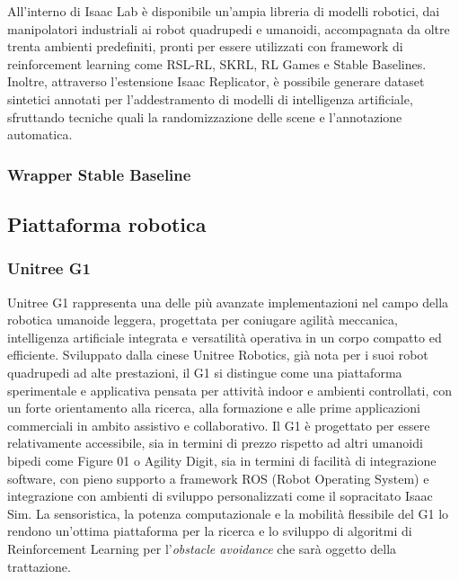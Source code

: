 All’interno di Isaac Lab è disponibile un’ampia libreria di modelli robotici, dai manipolatori industriali ai robot quadrupedi e umanoidi, accompagnata da oltre trenta ambienti predefiniti, pronti per essere utilizzati con framework di reinforcement learning come RSL-RL, SKRL, RL Games e Stable Baselines. Inoltre, attraverso l’estensione Isaac Replicator, è possibile generare dataset sintetici annotati per l’addestramento di modelli di intelligenza artificiale, sfruttando tecniche quali la randomizzazione delle scene e l’annotazione automatica.


\subsubsection{Wrapper Stable Baseline}


\subsection{Piattaforma robotica}
\subsubsection{Unitree G1}
Unitree G1 rappresenta una delle più avanzate implementazioni nel campo della robotica umanoide leggera, progettata per coniugare agilità meccanica, intelligenza artificiale integrata e versatilità operativa in un corpo compatto ed efficiente. Sviluppato dalla cinese Unitree Robotics, già nota per i suoi robot quadrupedi ad alte prestazioni, il G1 si distingue come una piattaforma sperimentale e applicativa pensata per attività indoor e ambienti controllati, con un forte orientamento alla ricerca, alla formazione e alle prime applicazioni commerciali in ambito assistivo e collaborativo. Il G1 è progettato per essere relativamente accessibile, sia in termini di prezzo rispetto ad altri umanoidi bipedi come Figure 01 o Agility Digit, sia in termini di facilità di integrazione software, con pieno supporto a framework ROS (Robot Operating System) e integrazione con ambienti di sviluppo personalizzati come il sopracitato Isaac Sim. La sensoristica, la potenza computazionale e la mobilità flessibile del G1 lo rendono un'ottima piattaforma per la ricerca e lo sviluppo di algoritmi di Reinforcement Learning per l'\textit{obstacle avoidance} che sarà oggetto della trattazione.

